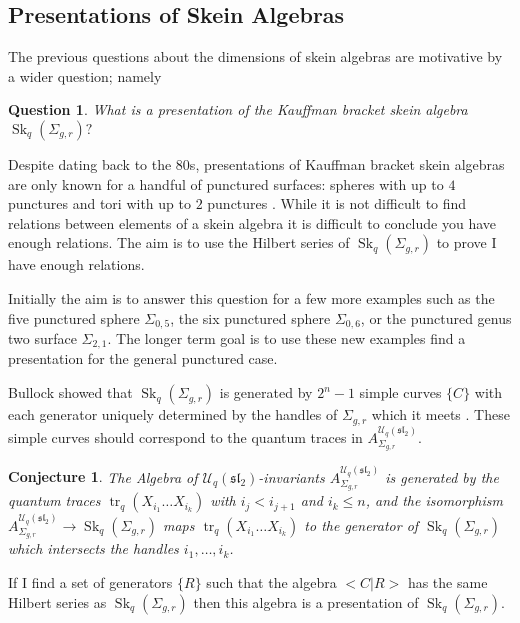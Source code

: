 \documentclass{article}
\newcommand{\Sk}{\operatorname{Sk}}
\newcommand{\slgroup}{\mathfrak{sl}}
\newcommand{\tr}{\operatorname{tr}_q}
\newtheorem{conj}[thm]{Conjecture}
\newtheorem{qs}[thm]{Question}
\begin{document}
\subsection{Presentations of Skein Algebras}

The previous questions about the dimensions of skein algebras are motivative by a wider question; namely

\begin{qs}
What is a presentation of the Kauffman bracket skein algebra $\Sk_q(\Sigma_{g,r})?$
\end{qs} 

Despite dating back to the 80s, presentations of Kauffman bracket skein algebras are only known for a handful of punctured surfaces: spheres with up to $4$ punctures and tori with up to $2$ punctures \cite{BullockPrzytycki00}. While it is not difficult to find relations between elements of a skein algebra it is difficult to conclude you have enough relations. The aim is to use the Hilbert series of $\Sk_q(\Sigma_{g,r})$ to prove I have enough relations.

Initially the aim is to answer this question for a few more examples such as the five punctured sphere $\Sigma_{0,5}$, the six punctured sphere $\Sigma_{0,6}$, or the punctured genus two surface $\Sigma_{2,1}$. The longer term goal is to use these new examples find a presentation for the general punctured case.

Bullock showed that $\Sk_q(\Sigma_{g,r})$ is generated by $2^n-1$ simple curves $ \{C\}$ with each generator uniquely determined by the handles of $\Sigma_{g,r}$ which it meets \cite{Bullock1999}. These simple curves should correspond to the quantum traces in $A_{\Sigma_{g,r}}^{\mathcal{U}_q(\slgroup_2)}$. 

\begin{conj}
\label{conj:IsomorphismMapsTrace}
The Algebra of $\mathcal{U}_q(\slgroup_2)$-invariants $A_{\Sigma_{g,r}}^{\mathcal{U}_q(\slgroup_2)}$ is generated by the quantum traces $\tr(X_{i_1} \dots X_{i_k})$ with $i_{j} < i_{j+1}$ and $i_k \leq n$, and  the isomorphism $A_{\Sigma_{g,r}}^{\mathcal{U}_q(\slgroup_2)} \to \Sk_q(\Sigma_{g,r})$ maps $\tr(X_{i_1} \dots X_{i_k})$ to the generator of $\Sk_q(\Sigma_{g,r})$ which intersects the handles $i_1, \dots, i_k$. 
\end{conj}

If I find a set of generators $\{R\}$ such that the algebra $< C | R>$ has the same Hilbert series as  $\Sk_q(\Sigma_{g,r})$ then this algebra is a presentation of $\Sk_q(\Sigma_{g,r})$. 
\end{document}
